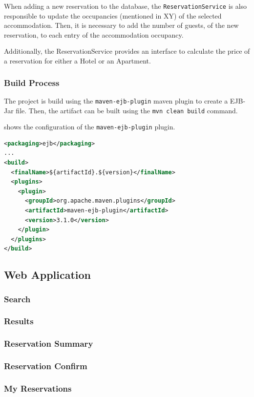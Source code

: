 When adding a new reservation to the database, the \texttt{ReservationService} is also responsible to update the occupancies (mentioned in XY) of the selected accommodation. Then, it is necessary to add the number of guests, of the new reservation, to each entry of the accommodation occupancy.

Additionally, the ReservationService provides an interface to calculate the price of a reservation for either a Hotel or an Apartment.


\subsubsection{Build Process}
The project is build using the \texttt{maven-ejb-plugin} maven plugin to create a EJB-Jar file.
Then, the artifact can be built using the \texttt{mvn clean build} command.

 shows the configuration of the \texttt{maven-ejb-plugin} plugin.
\begin{lstlisting}[label=lst:02_impl_ejb_buildprocess_pluginconfig, caption=\texttt{maven-ejb-plugin} plugin configuration, language=xml]
<packaging>ejb</packaging>
...
<build>
  <finalName>${artifactId}.${version}</finalName>
  <plugins>
    <plugin>
      <groupId>org.apache.maven.plugins</groupId>
      <artifactId>maven-ejb-plugin</artifactId>
      <version>3.1.0</version>
    </plugin>
  </plugins>
</build>
\end{lstlisting}



\subsection{Web Application}

\subsubsection{Search}

\subsubsection{Results}

\subsubsection{Reservation Summary}

\subsubsection{Reservation Confirm}

\subsubsection{My Reservations}
